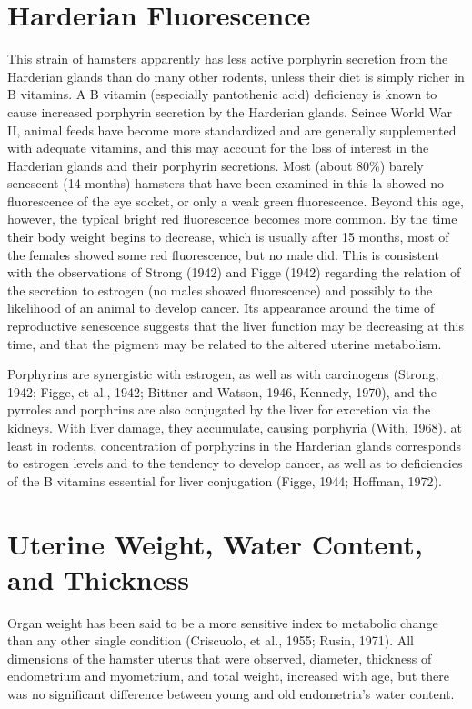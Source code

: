 \section{Harderian Fluorescence}

This strain of hamsters apparently has less active porphyrin secretion from the Harderian glands than do many other rodents, unless their diet is simply richer in B vitamins. A B vitamin (especially pantothenic acid) deficiency is known to cause increased porphyrin secretion by the Harderian glands. Seince World War II, animal feeds have become more standardized and are generally supplemented with adequate vitamins, and this may account for the loss of interest in the Harderian glands and their porphyrin secretions. Most (about 80\%) barely senescent (14 months) hamsters that have been examined in this la showed no fluorescence of the eye socket, or only a weak green fluorescence. Beyond this age, however, the typical bright red fluorescence becomes more common. By the time their body weight begins to decrease, which is usually after 15 months, most of the females showed some red fluorescence, but no male did. This is consistent with the observations of Strong (1942) and Figge (1942) regarding the relation of the secretion to estrogen (no males showed fluorescence) and possibly to the likelihood of an animal to develop cancer. Its appearance around the time of reproductive senescence suggests that the liver function may be decreasing at this time, and that the pigment may be related to the altered uterine metabolism.

Porphyrins are synergistic with estrogen, as well as with carcinogens (Strong, 1942; Figge, et al., 1942; Bittner and Watson, 1946, Kennedy, 1970), and the pyrroles and porphrins are also conjugated by the liver for excretion via the kidneys. With liver damage, they accumulate, causing porphyria (With, 1968). at least in rodents, concentration of porphyrins in the Harderian glands corresponds to estrogen levels and to the tendency to develop cancer, as well as to deficiencies of the B vitamins essential for liver conjugation (Figge, 1944; Hoffman, 1972).

\section{Uterine Weight, Water Content, and Thickness}

Organ weight has been said to be a more sensitive index to metabolic change than any other single condition (Criscuolo, et al., 1955; Rusin, 1971). All dimensions of the hamster uterus that were observed, diameter, thickness of endometrium and myometrium, and total weight, increased with age, but there was no significant difference between young and old endometria's water content.

